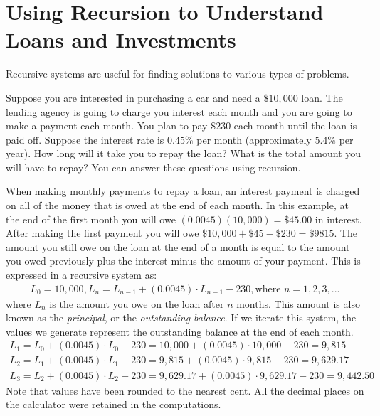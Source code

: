 \documentclass[10pt,]{book}
\theoremstyle{ptxdefinitionnotitle}
\theoremstyle{ptxdefinitiontitle}
\theoremstyle{ptxdefinitionnotitle}
\theoremstyle{ptxdefinitiontitle}
\theoremstyle{ptxdefinitionnotitle}
\theoremstyle{ptxdefinitiontitle}
\numberwithin{equation}{section}
\begin{document}
\section[{Using Recursion to Understand Loans and Investments}]{Using Recursion to Understand Loans and Investments}\label{chapter04-section02}
\hypertarget{p-30}{}%
Recursive systems are useful for finding solutions to various types of problems.%
\par
\hypertarget{p-31}{}%
Suppose you are interested in purchasing a car and need a \(\$10,000\) loan. The lending agency is going to charge you interest each month and you are going to make a payment each month. You plan to pay \(\$230\) each month until the loan is paid off. Suppose the interest rate is \(0.45\%\) per month (approximately \(5.4\%\) per year). How long will it take you to repay the loan? What is the total amount you will have to repay?  You can answer these questions using recursion.%
\par
\hypertarget{p-32}{}%
When making monthly payments to repay a loan, an interest payment is charged on all of the money that is owed at the end of each month.  In this example, at the end of the first month you will owe \((0.0045)(10,000)=\$45.00\) in interest. After making the first payment you will owe \(\$10,000+\$45-\$230=\$9815\). The amount you still owe on the loan at the end of a month is equal to the amount you owed previously plus the interest minus the amount of your payment. This is expressed in a recursive system as:%
%
\begin{gather*}
L_0=10,000, L_n = L_{n-1}+(0.0045)\cdot L_{n-1}-230, \text{where } n=1,2,3,...
\end{gather*}
\hypertarget{p-33}{}%
where \(L_n\) is the amount you owe on the loan after \(n\) months.  This amount is also known as the \emph{principal}, or the \emph{outstanding balance}. If we iterate this system, the values we generate represent the outstanding balance at the end of each month.%
%
\begin{gather*}
L_1=L_0+(0.0045)\cdot L_0-230=10,000+(0.0045)\cdot 10,000-230=9,815\\
L_2=L_1+(0.0045)\cdot L_1-230=9,815+(0.0045)\cdot 9,815-230=9,629.17\\
L_3=L_2+(0.0045)\cdot L_2-230=9,629.17+(0.0045)\cdot 9,629.17-230=9,442.50
\end{gather*}
\hypertarget{p-34}{}%
Note that values have been rounded to the nearest cent.  All the decimal places on the calculator were retained in the computations.%
\par
\end{document}
